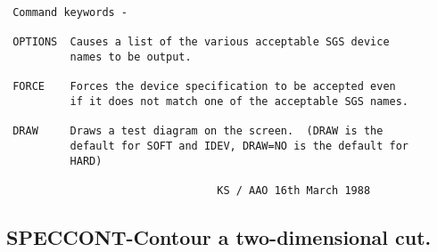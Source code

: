 \begin{description}
\begin{verbatim}
 Command keywords -

 OPTIONS  Causes a list of the various acceptable SGS device
          names to be output.

 FORCE    Forces the device specification to be accepted even
          if it does not match one of the acceptable SGS names.

 DRAW     Draws a test diagram on the screen.  (DRAW is the
          default for SOFT and IDEV, DRAW=NO is the default for
          HARD)

                                 KS / AAO 16th March 1988
\end{verbatim}
\end{description}
\subsection{SPECCONT-\label{SPECCONT}Contour a two-dimensional cut.}
